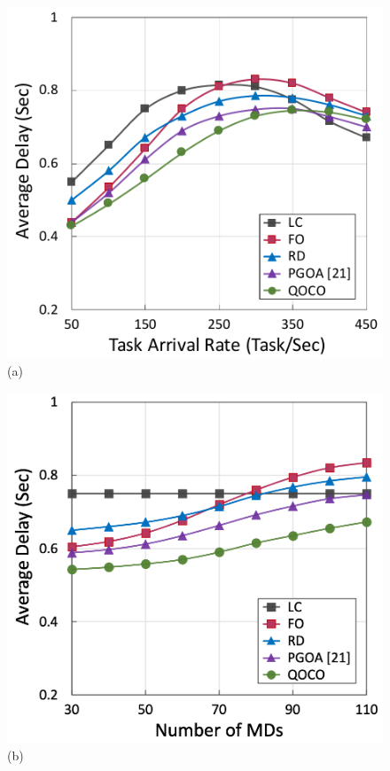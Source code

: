 \begin{frame}
	\begin{figure}
		\begin{minipage}[b]{0.47\linewidth}
			\centering
			\includegraphics[width=\textwidth]{333} 
			\hspace{0.6cm}(a)
		\end{minipage}
		\hspace{-0.2cm}
		\begin{minipage}[b]{0.47\linewidth}
			\centering
			\includegraphics[width=\textwidth]{334}
			\hspace{0.6cm}(b)
		\end{minipage}
		

\end{figure}
\end{frame}
